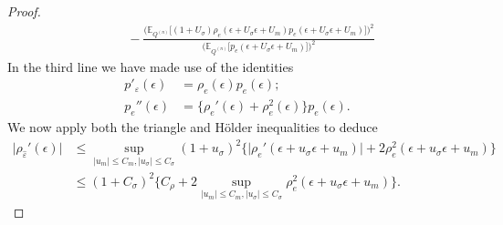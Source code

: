 \documentclass[aos]{imsart}
\newcommand{\E}{\mathbb{E}}
\begin{document}
\begin{proof}
\begin{align*}
			&\phantom{=} - \frac{\Big(\E_{Q^{(n)}}\big[ (1+U_\sigma)\rho_{e}(\epsilon+U_\sigma \epsilon + U_m) p_{e}(\epsilon+U_\sigma \epsilon + U_m) \big]\Big)^2}{\Big(\E_{Q^{(n)}}\big[ p_{e}(\epsilon+U_\sigma \epsilon + U_m) \big]\Big)^2} 
		\end{align*}
		In the third line we have made use of the identities \begin{align*}
			p'_\varepsilon(\epsilon) &= \rho_{e}(\epsilon)p_{e}(\epsilon);\\
			p_{e}''(\epsilon)&= \big\{\rho_{e}'(\epsilon)  +\rho_{e}^2(\epsilon)\big\} p_{e}(\epsilon).
		\end{align*}
		We now apply both the triangle and H\"older inequalities to deduce
		\begin{align*}
			\big| \rho_{\hat\varepsilon}'(\epsilon) \big|&\leq \sup_{|u_m|\leq C_m, |u_\sigma|\leq C_\sigma} (1+u_\sigma)^2\big\{ \big|\rho_{e}'(\epsilon+u_\sigma \epsilon + u_m)\big| + 2\rho_{e}^2 (\epsilon+u_\sigma \epsilon + u_m)\big\}\\
			&\leq (1+C_\sigma)^2\Bigg\{C_\rho + 2 \sup_{|u_m|\leq C_m, |u_\sigma|\leq C_\sigma} \rho_{e}^2 (\epsilon+u_\sigma \epsilon + u_m)\Bigg\}.
		\end{align*}
		

\end{proof}
\end{document}

